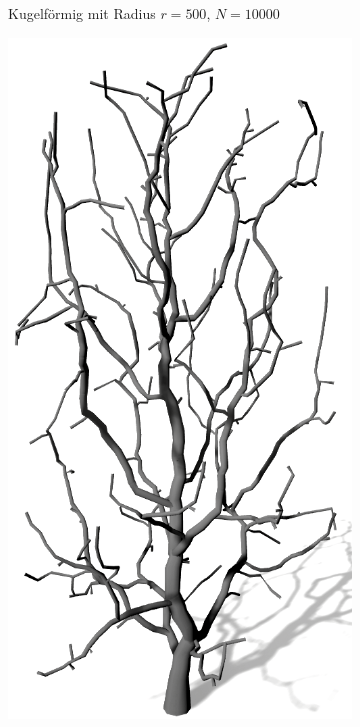\begin{figure} [hbtp]
\begin{subfigure}[t]{.45\textwidth}
		\caption{Kugelförmig mit Radius $r = 500$, $N = 10000$}
		\label{subfig:SCA_Einfluss_Sphere_High}
	\end{subfigure}	
	\begin{subfigure}[t]{.45\textwidth}
		\centering
		\includegraphics[height=.21\textheight]{images/SCA_Einfluss_Cylinder_Low.png}

\end{subfigure}
\end{figure}
